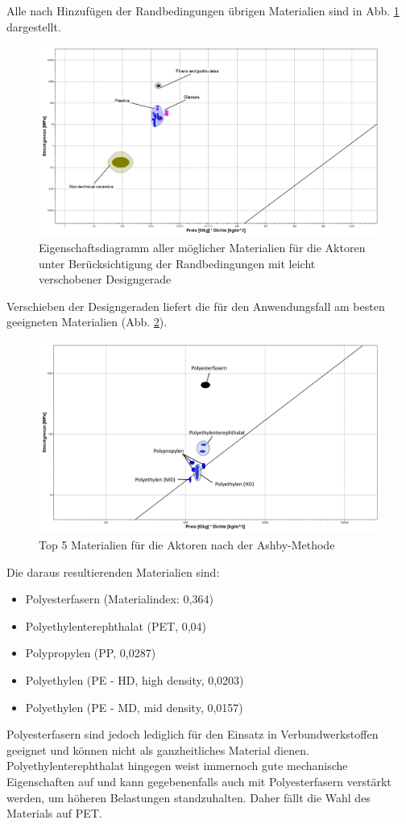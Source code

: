 Alle nach Hinzufügen der Randbedingungen übrigen Materialien sind in Abb. \ref{fig:ces_3_4_2} dargestellt.\\
\begin{figure}[H]
	\centering
	\includegraphics[width=1.0\linewidth]{chapter/Bilder/3_4_2}
	\caption{Eigenschaftsdiagramm aller möglicher Materialien für die Aktoren unter Berücksichtigung der Randbedingungen mit leicht verschobener Designgerade}
	\label{fig:ces_3_4_2}
\end{figure}
Verschieben der Designgeraden liefert die für den Anwendungsfall am besten geeigneten Materialien (Abb. \ref{fig:ces_3_4_3}).\\
\begin{figure}[H]
	\centering
	\includegraphics[width=1.0\linewidth]{chapter/Bilder/3_4_3}
	\caption{Top 5 Materialien für die Aktoren nach der Ashby-Methode}
	\label{fig:ces_3_4_3}
\end{figure}
Die daraus resultierenden Materialien sind:
\begin{itemize}
	\item[1)] Polyesterfasern (Materialindex: 0,364)
	\item[2)] Polyethylenterephthalat (PET, 0,04) 
	\item[3)] Polypropylen (PP, 0,0287)
	\item[4)] Polyethylen (PE - HD, high density, 0,0203)
	\item[5)] Polyethylen (PE - MD, mid density, 0,0157)
\end{itemize}
Polyesterfasern sind jedoch lediglich für den Einsatz in Verbundwerkstoffen geeignet und können nicht als ganzheitliches Material dienen. Polyethylenterephthalat hingegen weist immernoch gute mechanische Eigenschaften auf und kann gegebenenfalls auch mit Polyesterfasern verstärkt werden, um höheren Belastungen standzuhalten. Daher fällt die Wahl des Materials auf PET.